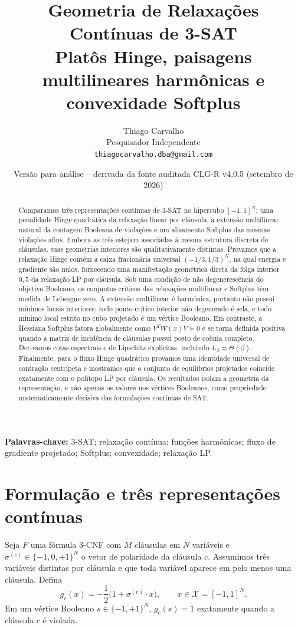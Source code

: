 \documentclass[11pt,a4paper]{article}
\title{Geometria de Relaxações Contínuas de 3-SAT\\\large Platôs Hinge, paisagens multilineares harmônicas e convexidade Softplus}
\author{Thiago Carvalho\\Pesquisador Independente\\\texttt{thiagocarvalho.dba@gmail.com}}
\date{Versão para análise -- derivada da fonte auditada CLG-R v4.0.5 (setembro de 2026)}
\newcommand{\X}{\mathcal X}
\begin{document}
\maketitle
\begin{abstract}
Comparamos três representações contínuas de 3-SAT no hipercubo $[-1,1]^N$: uma penalidade Hinge quadrática da relaxação linear por cláusula, a extensão multilinear natural da contagem Booleana de violações e um alisamento Softplus das mesmas violações afins. Embora as três estejam associadas à mesma estrutura discreta de cláusulas, suas geometrias interiores são qualitativamente distintas. Provamos que a relaxação Hinge contém a caixa fracionária universal $(-1/3,1/3)^N$, na qual energia e gradiente são nulos, fornecendo uma manifestação geométrica direta da folga interior $0{,}5$ da relaxação LP por cláusula. Sob uma condição de não degenerescência do objetivo Booleano, os conjuntos críticos das relaxações multilinear e Softplus têm medida de Lebesgue zero. A extensão multilinear é harmônica, portanto não possui mínimos locais interiores; todo ponto crítico interior não degenerado é sela, e todo mínimo local estrito no cubo projetado é um vértice Booleano. Em contraste, a Hessiana Softplus fatora globalmente como $V^TW(x)V\succeq0$ e se torna definida positiva quando a matriz de incidência de cláusulas possui posto de coluna completo. Derivamos cotas espectrais e de Lipschitz explícitas, incluindo $L_\beta=\Theta(\beta)$. Finalmente, para o fluxo Hinge quadrático provamos uma identidade universal de contração centrípeta e mostramos que o conjunto de equilíbrios projetados coincide exatamente com o politopo LP por cláusula. Os resultados isolam a geometria da representação, e não apenas os valores nos vértices Booleanos, como propriedade matematicamente decisiva das formulações contínuas de SAT.
\end{abstract}
\noindent\textbf{Palavras-chave:} 3-SAT; relaxação contínua; funções harmônicas; fluxo de gradiente projetado; Softplus; convexidade; relaxação LP.

\section{Formulação e três representações contínuas}
Seja $F$ uma fórmula 3-CNF com $M$ cláusulas em $N$ variáveis e $\sigma^{(c)}\in\{-1,0,+1\}^N$ o vetor de polaridade da cláusula $c$. Assumimos três variáveis distintas por cláusula e que toda variável aparece em pelo menos uma cláusula. Defina
\begin{equation}
g_c(x)=-\frac12\bigl(1+\sigma^{(c)}\cdot x\bigr),\qquad x\in\X=[-1,1]^N.
\end{equation}
Em um vértice Booleano $s\in\{-1,+1\}^N$, $g_c(s)=1$ exatamente quando a cláusula $c$ é violada.
\end{document}
